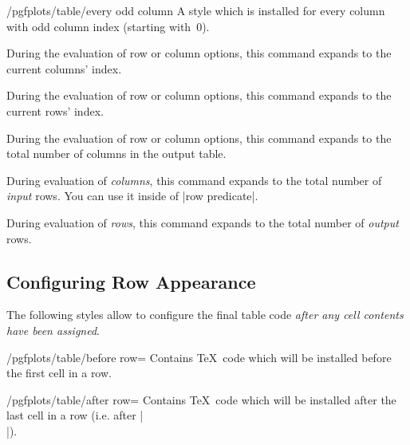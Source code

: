 \begin{stylekey}{/pgfplots/table/every odd column}
A style which is installed for every column with odd column index (starting with~$0$).
\end{stylekey}

\begin{command}{\pgfplotstablecol}
	During the evaluation of row or column options, this command expands to the current columns' index.
\end{command}
\label{pgfplotstable:page:tablerow}
\begin{command}{\pgfplotstablerow}
	During the evaluation of row or column options, this command expands to the current rows' index.
\end{command}
\begin{command}{\pgfplotstablecols}
	During the evaluation of row or column options, this command expands to the total number of columns in the output table.
\end{command}
\begin{command}{\pgfplotstablerows}
	During evaluation of \emph{columns}, this command expands to the total number of \emph{input} rows. You can use it inside of |row predicate|.

	During evaluation of \emph{rows}, this command expands to the total number of \emph{output} rows.
\end{command}


\subsection{Configuring Row Appearance}
The following styles allow to configure the final table code \emph{after any cell contents have been assigned}.

\begin{key}{/pgfplots/table/before row=}	
	Contains \TeX\ code which will be installed before the first cell in a row.
\end{key}

\begin{key}{/pgfplots/table/after row=}	
	Contains \TeX\ code which will be installed after the last cell in a row (i.e. after |\\|).
\end{key}

